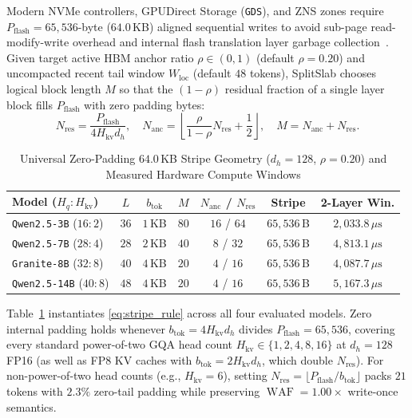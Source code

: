\documentclass[10pt,journal,compsoc]{IEEEtran}
\theoremstyle{definition}
\theoremstyle{remark}
\newcommand{\SplitSlab}{\textup{\textsc{SplitSlab}}}
\newcommand{\WAF}{\operatorname{WAF}}
\def\SplitSlab{SplitSlab}%
\begin{document}
Modern NVMe controllers, GPUDirect Storage (\texttt{GDS}), and ZNS zones require $P_{\mathrm{flash}} = 65{,}536$-byte ($64.0$\,KB) aligned sequential writes to avoid sub-page read-modify-write overhead and internal flash translation layer garbage collection~\cite{hu2009waf,bjorling2021zns}. Given target active HBM anchor ratio $\rho \in (0,1)$ (default $\rho = 0.20$) and uncompacted recent tail window $W_{\mathrm{loc}}$ (default $48$ tokens), \SplitSlab{} chooses logical block length $M$ so that the $(1-\rho)$ residual fraction of a single layer block fills $P_{\mathrm{flash}}$ with zero padding bytes:
\begin{equation}\label{eq:stripe_rule}
N_{\mathrm{res}} = \frac{P_{\mathrm{flash}}}{4 H_{\mathrm{kv}} d_h}, \quad
N_{\mathrm{anc}} = \left\lfloor \frac{\rho}{1-\rho} N_{\mathrm{res}} + \frac{1}{2} \right\rfloor, \quad
M = N_{\mathrm{anc}} + N_{\mathrm{res}}.
\end{equation}

\begin{table}[!t]
\centering
\caption{Universal Zero-Padding $64.0$\,KB Stripe Geometry ($d_h = 128$, $\rho = 0.20$) and Measured Hardware Compute Windows}
\label{tab:geometry}
\renewcommand{\arraystretch}{1.12}
\setlength{\tabcolsep}{3.8pt}
\begin{tabular}{@{}lcccccc@{}}
\toprule
\textbf{Model ($H_q{:}H_{\mathrm{kv}}$)} & $L$ & $b_{\mathrm{tok}}$ & $M$ & $N_{\mathrm{anc}}$ / $N_{\mathrm{res}}$ & \textbf{Stripe} & \textbf{2-Layer Win.} \\
\midrule
\texttt{Qwen2.5-3B} ($16{:}2$) & $36$ & $1$\,KB & $80$ & $16$ / $64$ & $65{,}536$\,B & $2{,}033.8\,\mu\mathrm{s}$ \\
\texttt{Qwen2.5-7B} ($28{:}4$) & $28$ & $2$\,KB & $40$ & $8$ / $32$ & $65{,}536$\,B & $4{,}813.1\,\mu\mathrm{s}$ \\
\texttt{Granite-8B} ($32{:}8$) & $40$ & $4$\,KB & $20$ & $4$ / $16$ & $65{,}536$\,B & $4{,}087.7\,\mu\mathrm{s}$ \\
\texttt{Qwen2.5-14B} ($40{:}8$) & $48$ & $4$\,KB & $20$ & $4$ / $16$ & $65{,}536$\,B & $5{,}167.3\,\mu\mathrm{s}$ \\
\bottomrule
\end{tabular}
\end{table}

Table~\ref{tab:geometry} instantiates \eqref{eq:stripe_rule} across all four evaluated models. Zero internal padding holds whenever $b_{\mathrm{tok}} = 4 H_{\mathrm{kv}} d_h$ divides $P_{\mathrm{flash}} = 65{,}536$, covering every standard power-of-two GQA head count $H_{\mathrm{kv}} \in \{1, 2, 4, 8, 16\}$ at $d_h = 128$ FP16 (as well as FP8 KV caches with $b_{\mathrm{tok}} = 2 H_{\mathrm{kv}} d_h$, which double $N_{\mathrm{res}}$). For non-power-of-two head counts (e.g., $H_{\mathrm{kv}} = 6$), setting $N_{\mathrm{res}} = \lfloor P_{\mathrm{flash}} / b_{\mathrm{tok}} \rfloor$ packs $21$ tokens with $2.3\%$ zero-tail padding while preserving $\WAF = 1.00\times$ write-once semantics.
\end{document}
